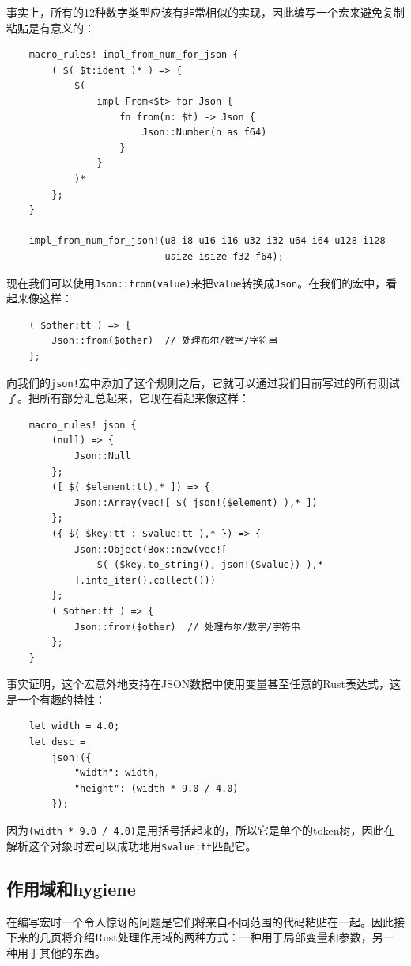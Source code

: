 事实上，所有的12种数字类型应该有非常相似的实现，因此编写一个宏来避免复制粘贴是有意义的：
\begin{verbatim}
    macro_rules! impl_from_num_for_json {
        ( $( $t:ident )* ) => {
            $(
                impl From<$t> for Json {
                    fn from(n: $t) -> Json {
                        Json::Number(n as f64)
                    }
                }
            )*
        };
    }

    impl_from_num_for_json!(u8 i8 u16 i16 u32 i32 u64 i64 u128 i128
                            usize isize f32 f64);
\end{verbatim}

现在我们可以使用\texttt{Json::from(value)}来把\texttt{value}转换成\texttt{Json}。在我们的宏中，看起来像这样：
\begin{verbatim}
    ( $other:tt ) => {
        Json::from($other)  // 处理布尔/数字/字符串
    };
\end{verbatim}

向我们的\texttt{json!}宏中添加了这个规则之后，它就可以通过我们目前写过的所有测试了。把所有部分汇总起来，它现在看起来像这样：
\begin{verbatim}
    macro_rules! json {
        (null) => {
            Json::Null
        };
        ([ $( $element:tt),* ]) => {
            Json::Array(vec![ $( json!($element) ),* ])
        };
        ({ $( $key:tt : $value:tt ),* }) => {
            Json::Object(Box::new(vec![
                $( ($key.to_string(), json!($value)) ),*
            ].into_iter().collect()))
        };
        ( $other:tt ) => {
            Json::from($other)  // 处理布尔/数字/字符串
        };
    }
\end{verbatim}

事实证明，这个宏意外地支持在JSON数据中使用变量甚至任意的Rust表达式，这是一个有趣的特性：
\begin{verbatim}
    let width = 4.0;
    let desc = 
        json!({
            "width": width,
            "height": (width * 9.0 / 4.0)
        });
\end{verbatim}

因为\texttt{(width * 9.0 / 4.0)}是用括号括起来的，所以它是单个的token树，因此在解析这个对象时宏可以成功地用\texttt{\$value:tt}匹配它。

\subsection{作用域和hygiene}
在编写宏时一个令人惊讶的问题是它们将来自不同范围的代码粘贴在一起。因此接下来的几页将介绍Rust处理作用域的两种方式：一种用于局部变量和参数，另一种用于其他的东西。

